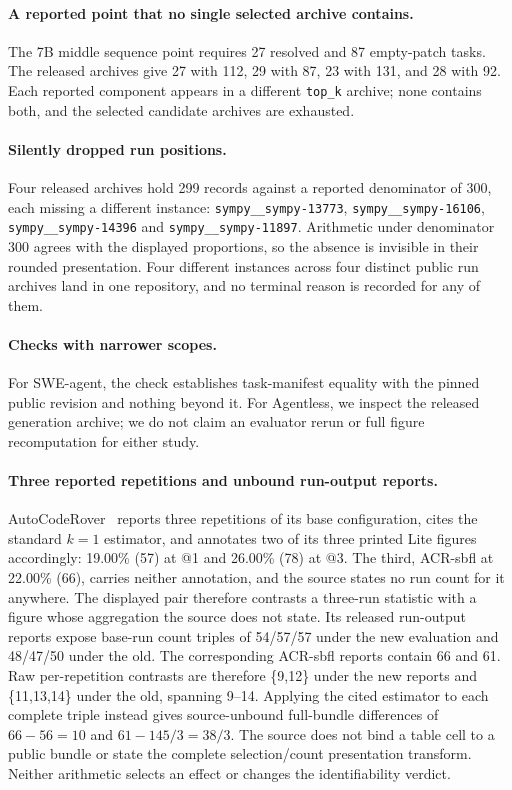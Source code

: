 \paragraph{A reported point that no single selected archive contains.}
The 7B middle sequence point requires 27 resolved and 87 empty-patch tasks. The released
archives give 27 with 112, 29 with 87, 23 with 131, and 28 with 92. Each reported component
appears in a different \texttt{top\_k} archive; none contains both, and the selected
candidate archives are exhausted.

\paragraph{Silently dropped run positions.}
Four released archives hold 299 records against a reported denominator of 300, each missing
a different instance: \texttt{sympy\_\_sympy-13773}, \texttt{sympy\_\_sympy-16106},
\texttt{sympy\_\_sympy-14396} and \texttt{sympy\_\_sympy-11897}. Arithmetic under denominator 300 agrees with the displayed proportions,
so the absence is invisible in their rounded presentation. Four different instances across four distinct
public run archives land in one repository, and no terminal reason is recorded for any of them.

\paragraph{Checks with narrower scopes.}
For SWE-agent, the check establishes task-manifest equality with the pinned public revision
and nothing beyond it. For Agentless, we inspect the released generation archive; we do not
claim an evaluator rerun or full figure recomputation for either study.

\paragraph{Three reported repetitions and unbound run-output reports.}
AutoCodeRover~\cite{AutocoderoverAutonomousProgram2024} reports three repetitions of its base
configuration, cites the standard $k=1$ estimator, and annotates two of its three printed Lite
figures accordingly: 19.00\% (57) at @1 and 26.00\% (78) at @3. The third, ACR-sbfl at
22.00\% (66), carries neither annotation, and the source states no run count for it anywhere.
The displayed pair therefore contrasts a three-run statistic with a figure whose aggregation
the source does not state. Its released
run-output reports expose base-run count triples of 54/57/57 under the new evaluation and
48/47/50 under the old. The corresponding ACR-sbfl reports contain 66 and 61. Raw
per-repetition contrasts are therefore \{9,12\} under the new reports and \{11,13,14\} under
the old, spanning 9--14. Applying the cited estimator to each complete triple instead gives
source-unbound full-bundle differences of $66-56=10$ and $61-145/3=38/3$. The source does
not bind a table cell to a public bundle or state the complete selection/count presentation
transform. Neither arithmetic selects an effect or changes the identifiability verdict.

